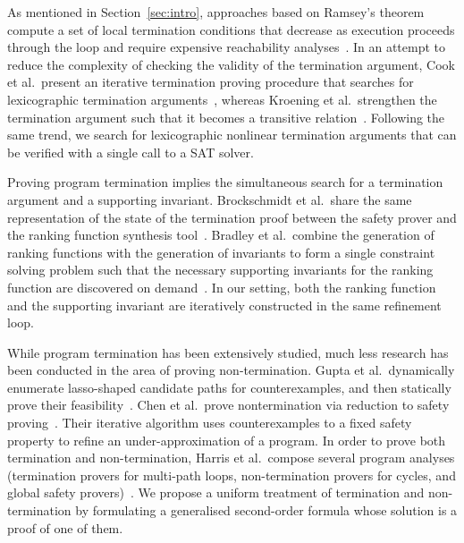 \documentclass[a4paper]{llncs}
\begin{document}
As mentioned in Section~\ref{sec:intro}, approaches based on Ramsey's
theorem compute a set of local termination conditions that decrease as
execution proceeds through the loop and require expensive reachability
analyses~\cite{DBLP:conf/lpe/CodishG03,DBLP:conf/lics/PodelskiR04,DBLP:conf/pldi/CookPR06}.  In an attempt to reduce the complexity of
checking the validity of the termination argument, Cook et al.~present an
iterative termination proving procedure that searches for lexicographic
termination arguments~\cite{DBLP:conf/tacas/CookSZ13}, whereas Kroening et
al.~strengthen the termination argument such that it becomes a transitive
relation~\cite{DBLP:conf/cav/KroeningSTW10}. Following the same trend, 
we search for lexicographic nonlinear termination arguments that can be verified 
with a single call to a SAT solver. 


Proving program termination implies the simultaneous search for a
termination argument and a supporting invariant.  Brock\-schmidt et
al.~share the same representation of the state of the termination proof
between the safety prover and the ranking function synthesis
tool~\cite{DBLP:conf/cav/BrockschmidtCF13}.  Bradley et al.~combine the
generation of ranking functions with the generation of invariants to form a
single constraint solving problem such that the necessary supporting
invariants for the ranking function are discovered on
demand~\cite{DBLP:conf/cav/BradleyMS05}.  In our setting, both the ranking
function and the supporting invariant are iteratively constructed in the
same refinement loop.

While program termination has been extensively studied, much less research
has been conducted in the area of proving non-termination.  Gupta et
al.~dynamically enumerate lasso-shaped candidate paths for counterexamples,
and then statically prove their
feasibility~\cite{DBLP:conf/popl/GuptaHMRX08}.  Chen et al.~prove
nontermination via reduction to safety
proving~\cite{DBLP:conf/tacas/ChenCFNO14}.  Their iterative algorithm uses
counterexamples to a fixed safety property to refine an under-approximation
of a program.  In order to prove both termination and non-termination,
Harris et al.~compose several program analyses (termination provers for
multi-path loops, non-termination provers for cycles, and global safety
provers)~\cite{DBLP:conf/sas/HarrisLNR10}.  We propose a uniform treatment
of termination and non-termination by formulating a generalised second-order
formula whose solution is a proof of one of them.




{}
\end{document}
